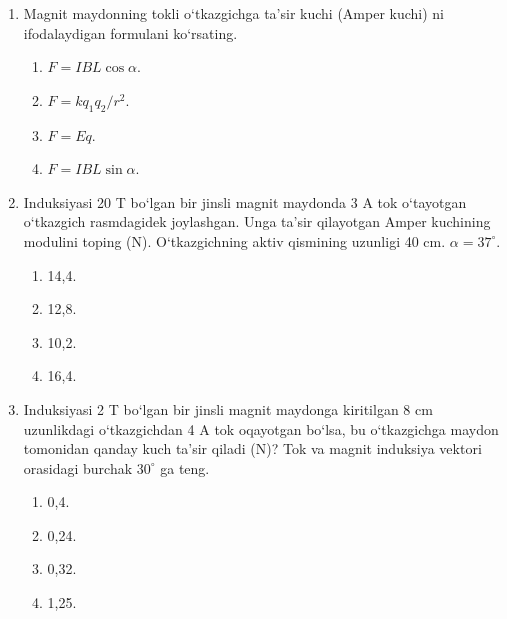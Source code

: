 \begin{enumerate}

\item Magnit maydonning tokli o‘tkazgichga ta’sir kuchi (Amper kuchi) ni ifodalaydigan formulani ko‘rsating.
\begin{enumerate}[label=\Alph*)]
\item $F = IBL\cos\alpha$.
\item $F = kq_1q_2/r^2$.
\item $F = Eq$.
\item $F = IBL\sin\alpha$.
\end{enumerate}

\item Induksiyasi 20 T bo‘lgan bir jinsli magnit maydonda 3 A tok o‘tayotgan o‘tkazgich rasmdagidek joylashgan. Unga ta’sir qilayotgan Amper kuchining modulini toping (N). O‘tkazgichning aktiv qismining uzunligi 40 cm. $\alpha=37^\circ$.


\begin{enumerate}[label=\Alph*)]
\item 14,4.
\item 12,8.
\item 10,2.
\item 16,4.
\end{enumerate}

\item Induksiyasi 2 T bo‘lgan bir jinsli magnit maydonga kiritilgan 8 cm uzunlikdagi o‘tkazgichdan 4 A tok oqayotgan bo‘lsa, bu o‘tkazgichga maydon tomonidan qanday kuch ta’sir qiladi (N)? Tok va magnit induksiya vektori orasidagi burchak $30^\circ$ ga teng.
\begin{enumerate}[label=\Alph*)]
\item 0,4.
\item 0,24.
\item 0,32.
\item 1,25.
\end{enumerate}


\end{enumerate}
